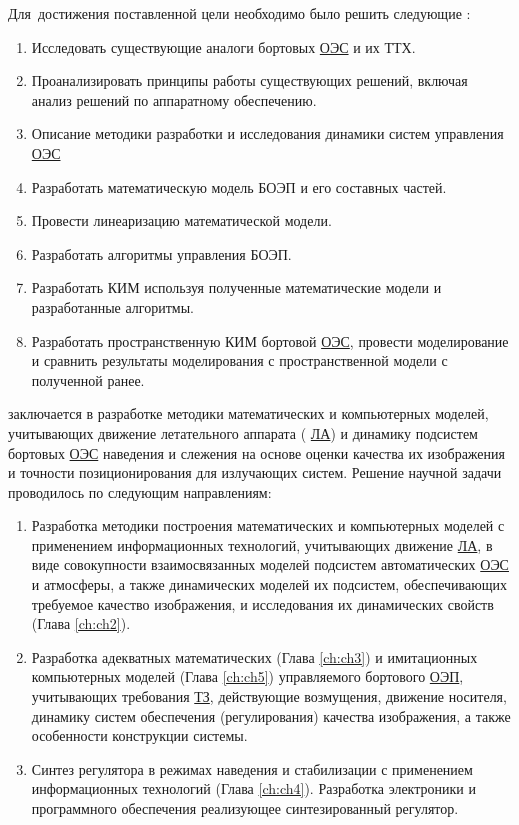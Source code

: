 Для~достижения поставленной цели необходимо было решить следующие {\tasks}:
\begin{enumerate}
  \item Исследовать существующие аналоги бортовых  \hyperref[acroEOS]{ОЭС} и их ТТХ.
  \item Проанализировать принципы работы существующих решений, включая анализ решений по аппаратному обеспечению.
  \item Описание методики разработки и исследования динамики систем управления \hyperref[acroEOS]{ОЭС}
  \item Разработать математическую модель БОЭП и его составных частей.
  \item Провести линеаризацию математической модели.
  \item Разработать алгоритмы управления БОЭП.
  \item Разработать КИМ используя полученные математические модели и разработанные алгоритмы.
  \item Разработать пространственную КИМ бортовой \hyperref[acroEOS]{ОЭС}, провести моделирование и сравнить результаты моделирования с пространственной модели с полученной ранее.
\end{enumerate}


{\novelty} заключается в разработке методики математических и компьютерных моделей, учитывающих движение летательного аппарата ( \hyperref[acroLA]{ЛА}) и динамику подсистем бортовых  \hyperref[acroEOS]{ОЭС} наведения и слежения на основе оценки качества их изображения и точности позиционирования для излучающих систем. Решение научной задачи проводилось по следующим направлениям:
\begin{enumerate}
  \item Разработка методики построения математических и компьютерных моделей с применением информационных технологий, учитывающих движение  \hyperref[acroLA]{ЛА}, в виде совокупности взаимосвязанных моделей подсистем автоматических  \hyperref[acroEOS]{ОЭС} и атмосферы, а также динамических моделей их подсистем, обеспечивающих требуемое качество изображения, и исследования их динамических свойств (Глава \ref{ch:ch2}). 
  \item Разработка адекватных математических (Глава \ref{ch:ch3}) и имитационных компьютерных моделей (Глава \ref{ch:ch5}) управляемого бортового  \hyperref[acroEOS]{ОЭП}, учитывающих требования  \hyperref[acroTZ]{ТЗ}, действующие возмущения, движение носителя, динамику систем обеспечения (регулирования) качества изображения, а также особенности конструкции системы. 
  \item Синтез регулятора в режимах наведения и стабилизации с применением информационных технологий (Глава \ref{ch:ch4}). Разработка электроники и программного обеспечения реализующее синтезированный регулятор.
\end{enumerate}

